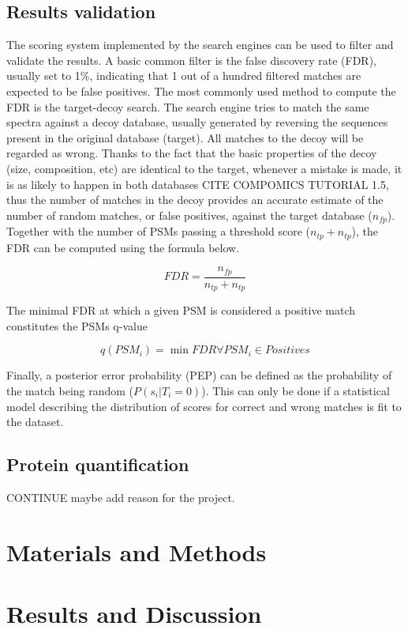\documentclass[11pt, a4paper]{report}
\begin{document}
\section{Results validation}
\label{sec:validation}

The scoring system implemented by the search engines can be used to filter and validate the results. A basic common filter is the false discovery rate (FDR), usually set to 1\%, indicating that 1 out of a hundred filtered matches are expected to be false positives. The most commonly used method to compute the FDR is the target-decoy search. The search engine tries to match the same spectra against a decoy database, usually generated by reversing the sequences present in the original database (target). All matches to the decoy will be regarded as wrong. Thanks to the fact that the basic properties of the decoy (size, composition, etc) are identical to the target, whenever a mistake is made, it is as likely to happen in both databases CITE COMPOMICS TUTORIAL 1.5, thus the number of matches in the decoy provides an accurate estimate of the number of random matches, or false positives, against the target database ($n_{fp}$). Together with the number of PSMs passing a threshold score ($n_{tp} + n_{tp}$), the FDR can be computed using the formula below.

$$FDR = \frac{n_{fp}}{n_{tp} + n_{tp}}$$

The minimal FDR at which a given PSM is considered a positive match constitutes the PSM\textquotesingle s q-value

$$ q(PSM_i) = \min FDR \forall PSM_i \in Positives$$

Finally, a posterior error probability (PEP) can be defined as the probability of the match being random ($P(s_i | T_i = 0)$). This can only be done if a statistical model describing the distribution of scores for correct and wrong matches is fit to the dataset.


\section{Protein quantification}




CONTINUE maybe add reason for the project.

\chapter{Materials and Methods}

\chapter{Results and Discussion}
\end{document}
